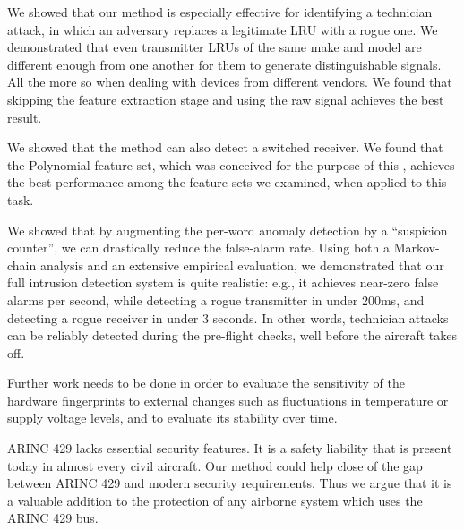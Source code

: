 \documentclass[compsoc,conference,a4paper,10pt,times]{IEEEtran}
\makeatletter
\newcommand{\enableopenany}{%
  \@openrightfalse%
}
\newcommand{\disableopenany}{%
  \@openrighttrue%
}
\newcommand{\newchapterevenpage}{%
    \enableopenany
    \chapter*{}
    \checkoddpage
    \ifoddpage
      \newpage
    \else
    \fi
    \disableopenany
  }
\makeatother
\begin{document}
  We showed that our method is especially effective for identifying a technician attack, in which an adversary replaces a legitimate LRU with a rogue one. We demonstrated that even transmitter LRUs of the same make and model are different enough from one another for them to generate distinguishable signals. All the more so when dealing with devices from different vendors. We found that skipping the feature extraction stage and using the raw signal achieves the best result.
  
  We showed that the method can also detect a switched receiver. We found that the Polynomial feature set, which was conceived for the purpose of this \iftoggle{paper} {paper} {work}, achieves the best performance among the feature sets we examined, when applied to this task.

  We showed that by augmenting the per-word anomaly detection by a ``suspicion counter'', we can drastically reduce the false-alarm rate. Using both a Markov-chain analysis and an extensive empirical evaluation, we demonstrated that our full intrusion detection system is quite realistic: e.g., it achieves near-zero false alarms per second, while detecting a rogue transmitter in under 200ms, and detecting a rogue receiver in under 3 seconds. In other words, technician attacks can be reliably detected during the pre-flight checks, well before the aircraft takes off.
  
  Further work needs to be done in order to evaluate the sensitivity of the hardware fingerprints to external changes such as fluctuations in temperature or supply voltage levels, and to evaluate its stability over time.
  
  ARINC 429 lacks essential security features. It is a safety liability that is present today in almost every civil aircraft.
  Our method could help close of the gap between ARINC 429 and modern security requirements. Thus we argue that it is a valuable addition to the protection of any airborne system which uses the ARINC 429 bus.
  
  
  
  

 

\iftoggle{paper}{
}{
  \newchapterevenpage
  
}
\end{document}
